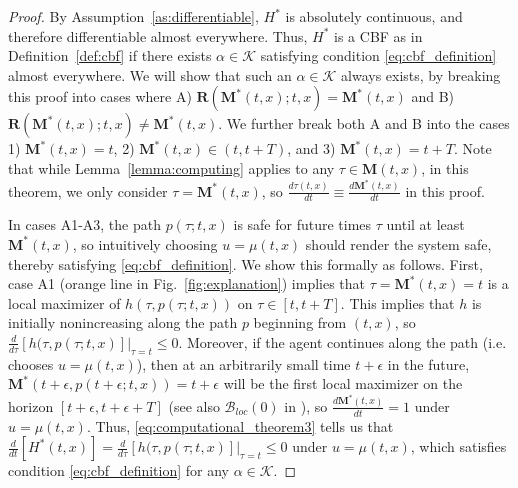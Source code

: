 \documentclass[10pt,conference]{ieeeconf}
\renewcommand{\(}{\left(}
\renewcommand{\)}{\right)}
\renewcommand{\[}{\left[}
\renewcommand{\]}{\right]}
\begin{document}
\begin{proof}
By Assumption~\ref{as:differentiable}, $H^*$ is absolutely continuous, and therefore differentiable almost everywhere. Thus, $H^*$ is a CBF {as in Definition~\ref{def:cbf}} if there exists $\alpha\in\mathcal{K}$ satisfying condition \eqref{eq:cbf_definition} almost everywhere. We will show that such an $\alpha\in\mathcal{K}$ always exists, by breaking this proof into cases where A) $\boldsymbol{R}(\boldsymbol{M}^*(t,x);t,x) = \boldsymbol{M}^*(t,x)$ and B) $\boldsymbol{R}(\boldsymbol{M}^*(t,x);t,x) \neq \boldsymbol{M}^*(t,x)$. We further break both A and B into the cases 1) $\boldsymbol{M}^*(t,x) = t$, 2)  $\boldsymbol{M}^*(t,x) \in (t, t+T)$, and 3) $\boldsymbol{M}^*(t,x) = t+T$. Note that while Lemma~\ref{lemma:computing} applies to any $\tau \in \boldsymbol{M}(t,x)$, in this theorem, we only consider $\tau = \boldsymbol{M}^*(t,x)$, so $\frac{d\tau(t,x)}{dt} \equiv \frac{d\boldsymbol{M}^*(t,x)}{dt}$ in this proof.

In cases A1-A3, the path $p(\tau;t,x)$ is safe for {future times} $\tau$ {until at least $\boldsymbol{M}^*(t,x)$}, so intuitively choosing $u = \mu(t,x)$ should render the system safe, thereby satisfying \eqref{eq:cbf_definition}. We show this formally as follows.
%
First, case A1 (orange line in Fig.~\ref{fig:explanation}) implies that $\tau = \boldsymbol{M}^*(t,x) = t$ is a local maximizer of $h(\tau,p(\tau;t,x))$ on $\tau \in [t,t+T]$. This implies that $h$ is initially nonincreasing along the path $p$ beginning from $(t,x)$, so $\frac{d}{d\tau}\left.[h(\tau,p(\tau;t,x)]\right|_{\tau=t} \leq 0$. Moreover, if the agent continues along the path (i.e. chooses $u = \mu(t,x)$), then at an arbitrarily small time $t+\epsilon$ in the future, $\boldsymbol{M}^*(t + \epsilon,p(t+\epsilon;t,x)) = t+\epsilon$ will be the first local maximizer on the horizon $[t+\epsilon,t+\epsilon+T]$ {(see also $\mathcal{B}_{loc}(0)$ in \cite[Fig.~2]{Automatica})}, so $\frac{d\boldsymbol{M}^*(t,x)}{dt} = 1$ under $u = \mu(t,x)$. Thus, \eqref{eq:computational_theorem3} tells us 
that $\frac{d}{dt}[H^*(t,x)] =\frac{d}{d\tau}\left.[h(\tau,p(\tau;t,x)]\right|_{\tau=t}\leq 0$ under $u = \mu(t,x)$, which satisfies condition \eqref{eq:cbf_definition} for any $\alpha \in \mathcal{K}$.


\end{proof}
\end{document}
